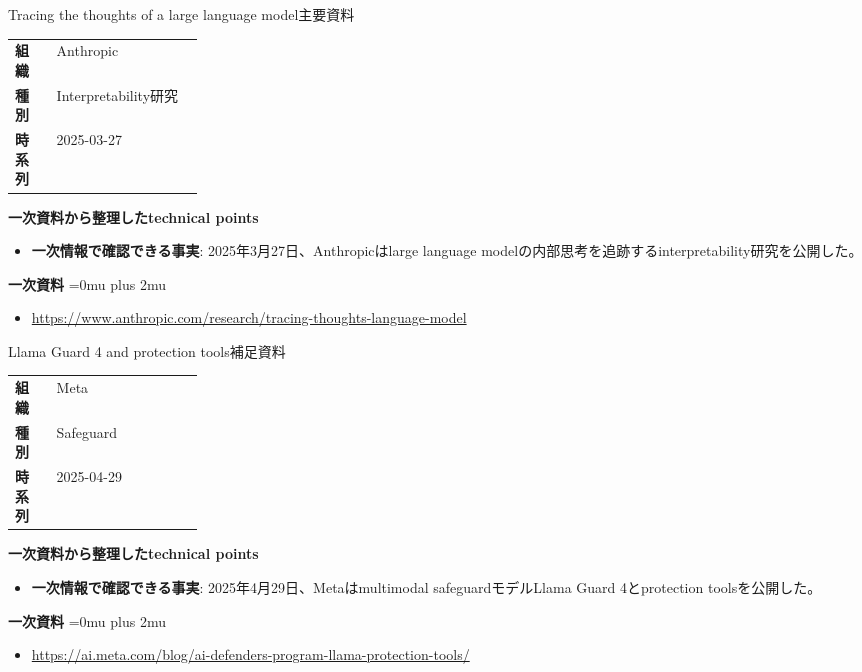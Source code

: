 \begin{technicalnote}{Tracing the thoughts of a large language model}{主要資料}
\begingroup
\begin{tabularx}{\linewidth}{@{}>{\bfseries}p{0.22\linewidth}X@{}}
組織 & Anthropic \\
種別 & Interpretability研究 \\
時系列 & 2025-03-27 \\
\end{tabularx}
\smallskip
{\bfseries 一次資料から整理したtechnical points}
\begin{itemize}[leftmargin=1.5em,itemsep=0.35em]
\item \textbf{一次情報で確認できる事実}: 2025年3月27日、Anthropicはlarge language modelの内部思考を追跡するinterpretability研究を公開した。
\end{itemize}
\begin{samepage}
{\bfseries 一次資料}
\begingroup\sloppy
\Urlmuskip=0mu plus 2mu\relax
\begin{itemize}[leftmargin=1.5em,itemsep=0.25em]
\item {\scriptsize\url{https://www.anthropic.com/research/tracing-thoughts-language-model}}
\end{itemize}
\endgroup
\end{samepage}
\endgroup
\end{technicalnote}
\medskip

\begin{technicalnote}{Llama Guard 4 and protection tools}{補足資料}
\begingroup
\begin{tabularx}{\linewidth}{@{}>{\bfseries}p{0.22\linewidth}X@{}}
組織 & Meta \\
種別 & Safeguard \\
時系列 & 2025-04-29 \\
\end{tabularx}
\smallskip
{\bfseries 一次資料から整理したtechnical points}
\begin{itemize}[leftmargin=1.5em,itemsep=0.35em]
\item \textbf{一次情報で確認できる事実}: 2025年4月29日、Metaはmultimodal safeguardモデルLlama Guard 4とprotection toolsを公開した。
\end{itemize}
\begin{samepage}
{\bfseries 一次資料}
\begingroup\sloppy
\Urlmuskip=0mu plus 2mu\relax
\begin{itemize}[leftmargin=1.5em,itemsep=0.25em]
\item {\scriptsize\url{https://ai.meta.com/blog/ai-defenders-program-llama-protection-tools/}}
\end{itemize}
\endgroup
\end{samepage}
\endgroup
\end{technicalnote}
\medskip

